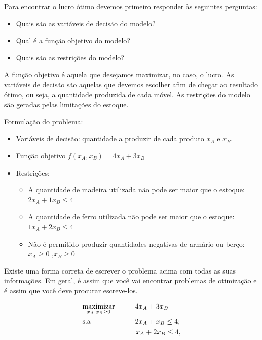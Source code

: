 Para encontrar o lucro ótimo devemos primeiro responder às seguintes perguntas:
\begin{itemize}
\item Quais são as variáveis de decisão do modelo?
\item Qual é a função objetivo do modelo?
\item Quais são as restrições do modelo?
\end{itemize}

A função objetivo é aquela que desejamos maximizar, no caso, o lucro. As variáveis de decisão são aquelas que devemos escolher afim de chegar ao resultado ótimo, ou seja, a quantidade produzida de cada móvel. As restrições do modelo são geradas pelas limitações do estoque. 

Formulação do problema:
\begin{itemize}
\item Variáveis de decisão: quantidade a produzir de cada produto $x_{A}$ e
$x_{B}$.
\item Função objetivo $f(x_{A},x_{B})=4x_{A}+3x_{B}$
\item Restrições:



\begin{itemize}
\item A quantidade de madeira utilizada não pode ser maior que o estoque:
$2x_{A}+1x_{B}\leq4$
\item A quantidade de ferro utilizada não pode ser maior que o estoque:
$1x_{A}+2x_{B}\leq4$
\item Não é permitido produzir quantidades negativas de armário ou berço: $x_{A}\geq0$ ,$x_{B}\geq0$\end{itemize}
\end{itemize}

Existe uma forma correta de escrever o problema acima com todas as suas informações. Em geral, é assim que você vai encontrar problemas de otimização e é assim que você deve procurar escreve-los. 

\begin{align}
    & \underset{x_A, x_B\geq0}{\text{maximizar}} \hspace{1cm} 4x_A+3x_B \label{eq1} \\
    & \text{s.a}  \hspace{2.2cm} 2x_A+x_B \leq 4; \label{eq2} \\
    &             \hspace{2.65cm} x_A+2x_B\leq 4, \label{eq3}
\end{align}


